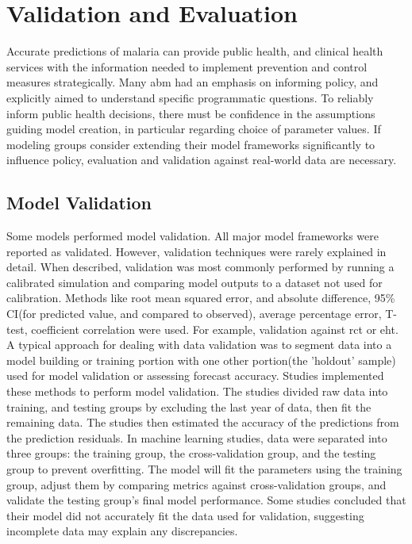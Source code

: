 \documentclass[a4paper, 12pt, twoside]{report}
\begin{document}
\section{Validation and Evaluation}
Accurate predictions of malaria can provide public health, and clinical health services with the information needed to implement prevention and control measures strategically.
Many \gls{abm} had an emphasis on informing policy, and explicitly aimed to understand specific programmatic questions.
To reliably inform public health decisions, there must be confidence in the assumptions guiding model creation, in particular regarding choice of parameter values.
If modeling groups consider extending their model frameworks significantly to influence policy, evaluation and validation against real-world data are necessary.

\subsection{Model Validation}%
\label{par:validation}
Some models performed model validation.
All major model frameworks were reported as validated.
However, validation techniques were rarely explained in detail.
When described, validation was most commonly performed by running a calibrated simulation and comparing model outputs to a dataset not used for calibration.
Methods like root mean squared error, and absolute difference\cite{Adimi2010, Rahman2011}, 95\% CI(for predicted value, and compared to observed)\cite{Chatterjee2009,Gomez-Elipe2007,Roy2011}, average percentage error\cite{Haghdoost2008}, T-test\cite{Xiao2010}, coefficient correlation\cite{Yacob1947} were used.
For example, validation against \gls{rct} or \gls{eht}.
A typical approach for dealing with data validation was to segment data into a model building or training portion with one other portion(the 'holdout' sample) used for model validation or assessing forecast accuracy.
Studies\cite{Parveen2021,Rahman2011} implemented these methods to perform model validation.
The studies divided raw data into training, and testing groups by excluding the last year of data, then fit the remaining data.
The studies then estimated the accuracy of the predictions from the prediction residuals.
In machine learning studies, data were separated into three groups: the training group, the cross-validation group, and the testing group to prevent overfitting.
The model will fit the parameters using the training group, adjust them by comparing metrics against cross-validation groups, and validate the testing group's final model performance.
Some studies concluded that their model did not accurately fit the data used for validation, suggesting incomplete data may explain any discrepancies.
\end{document}

